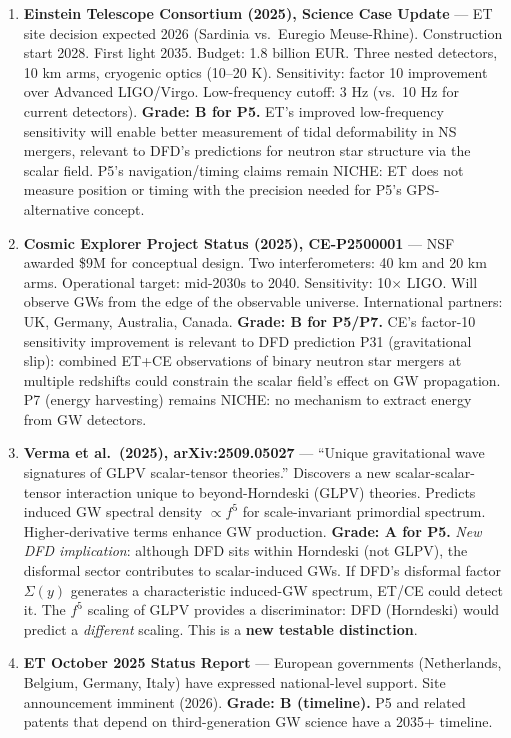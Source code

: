\documentclass[11pt,a4paper]{article}
\begin{document}
\begin{enumerate}

\item \textbf{Einstein Telescope Consortium (2025), Science Case Update} --- ET site decision expected 2026 (Sardinia vs.\ Euregio Meuse-Rhine). Construction start 2028. First light 2035. Budget: 1.8 billion EUR. Three nested detectors, 10 km arms, cryogenic optics (10--20 K). Sensitivity: factor 10 improvement over Advanced LIGO/Virgo. Low-frequency cutoff: 3 Hz (vs.\ 10 Hz for current detectors). \textbf{Grade: B for P5.} ET's improved low-frequency sensitivity will enable better measurement of tidal deformability in NS mergers, relevant to DFD's predictions for neutron star structure via the scalar field. P5's navigation/timing claims remain NICHE: ET does not measure position or timing with the precision needed for P5's GPS-alternative concept.

\item \textbf{Cosmic Explorer Project Status (2025), CE-P2500001} --- NSF awarded \$9M for conceptual design. Two interferometers: 40 km and 20 km arms. Operational target: mid-2030s to 2040. Sensitivity: 10$\times$ LIGO. Will observe GWs from the edge of the observable universe. International partners: UK, Germany, Australia, Canada. \textbf{Grade: B for P5/P7.} CE's factor-10 sensitivity improvement is relevant to DFD prediction P31 (gravitational slip): combined ET+CE observations of binary neutron star mergers at multiple redshifts could constrain the scalar field's effect on GW propagation. P7 (energy harvesting) remains NICHE: no mechanism to extract energy from GW detectors.

\item \textbf{Verma et al.\ (2025), arXiv:2509.05027} --- ``Unique gravitational wave signatures of GLPV scalar-tensor theories.'' Discovers a new scalar-scalar-tensor interaction unique to beyond-Horndeski (GLPV) theories. Predicts induced GW spectral density $\propto f^5$ for scale-invariant primordial spectrum. Higher-derivative terms enhance GW production. \textbf{Grade: A for P5.} \emph{New DFD implication}: although DFD sits within Horndeski (not GLPV), the disformal sector contributes to scalar-induced GWs. If DFD's disformal factor $\Sigma(y)$ generates a characteristic induced-GW spectrum, ET/CE could detect it. The $f^5$ scaling of GLPV provides a discriminator: DFD (Horndeski) would predict a \emph{different} scaling. This is a \textbf{new testable distinction}.

\item \textbf{ET October 2025 Status Report} --- European governments (Netherlands, Belgium, Germany, Italy) have expressed national-level support. Site announcement imminent (2026). \textbf{Grade: B (timeline).} P5 and related patents that depend on third-generation GW science have a 2035+ timeline.

\end{enumerate}
\end{document}
